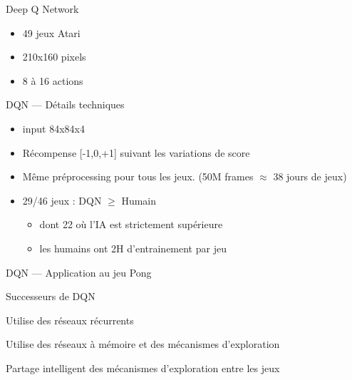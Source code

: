 \begin{frame}{Deep Q Network}
  \begin{itemize}
  \item 49 jeux Atari
  \item 210x160 pixels
  \item 8 à 16 actions
  \end{itemize}
\end{frame}

\begin{frame}{DQN --- Détails techniques}
  \begin{itemize}
  \item input 84x84x4
  \item Récompense [-1,0,+1] suivant les variations de score
  \item Même préprocessing pour tous les jeux. (50M frames $\approx$ 38 jours de jeux)
  \item 29/46 jeux : DQN $\geq$ Humain
    \begin{itemize}
    \item dont 22 où l'IA est strictement supérieure
    \item les humains ont 2H d'entrainement par jeu
    \end{itemize}
  \end{itemize}
\end{frame}

\begin{frame}{DQN --- Application au jeu Pong}
\end{frame}

\begin{frame}{Successeurs de DQN}
  \begin{description}[<+->]
    \item[R2D2] Utilise des réseaux récurrents
    \item[Never Give Up] Utilise des réseaux à mémoire et des mécanismes d'exploration
    \item[Agent57] Partage intelligent des mécanismes d'exploration entre les jeux
  \end{description}


\end{frame}
